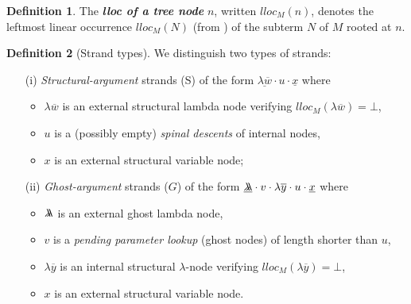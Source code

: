 \documentclass[xchauthor,chkrefs,GCNS,amsmath,amsthm,rotating,leaveRGB]{tcsg}
\renewcommand{\index}[1]{}
\theoremstyle{plain}
\theoremstyle{definition}
\newtheorem{definition}{Definition}[section]
\newcommand{\ghostlmd}{{\lambda\mkern-7mu \lambda}}
\begin{document}
\begin{definition}
The \textbf{\emph{lloc of a tree node}}\index{lloc of a tree node} $n$,
written $lloc_{M}(n)$, denotes the leftmost linear occurrence $lloc_{M}(N)$
(from ) of the subterm
$N$ of $M$ rooted at $n$.
\end{definition}


\begin{definition}[Strand types]\label{def:strandtypes}
We distinguish two types of strands:
%
\begin{enumerate}[(ii)]
\item[(i)] \emph{Structural-argument} strands (S) of the form
    $\underline{\lambda \overline{w}} \cdot u \cdot \underline{x}$ where
%
\begin{itemize}
\item $\lambda \overline{w}$ is an external structural lambda node
    verifying $lloc_{M}(\lambda \overline{w}) = \bot $,
%
\item $u$ is a (possibly empty) \emph{spinal descents} of internal nodes,
%
\item $x$ is an external structural variable node;
\end{itemize}
%
\item[(ii)] \emph{Ghost-argument} strands ($G$) of the form
    $\underline{\ghostlmd } \cdot  v \cdot \lambda \overline{y} \cdot u
    \cdot \underline{x}$ where
%
\begin{itemize}
\item $\ghostlmd $ is an external ghost lambda node,
%
\item $v$ is a \emph{pending parameter lookup} (ghost nodes) of length
    shorter than $u$,
%
\item $\lambda \overline{y}$ is an internal structural $\lambda $-node
    verifying $lloc_{M}(\lambda \overline{y}) = \bot $,
%
\item $x$ is an external structural variable node.
\end{itemize}
\end{enumerate}
\end{definition}
\end{document}
